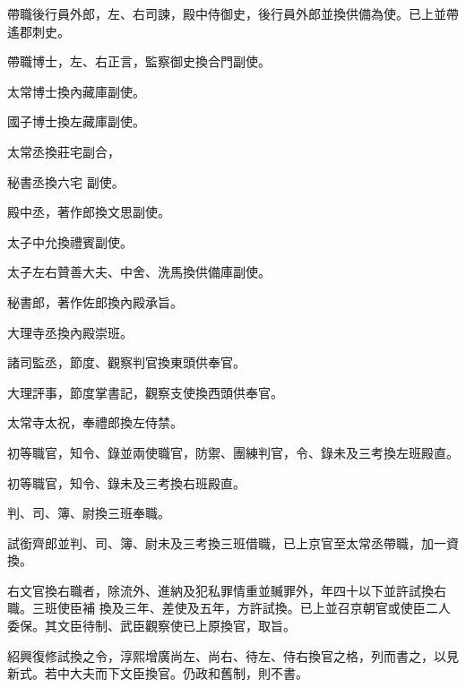 \begin{pinyinscope}
 帶職後行員外郎，左、右司諫，殿中侍御史，後行員外郎並換供備為使。已上並帶遙郡刺史。



 帶職博士，左、右正言，監察御史換合門副使。



 太常博士換內藏庫副使。



 國子博士換左藏庫副使。



 太常丞換莊宅副合，



 秘書丞換六宅
 副使。



 殿中丞，著作郎換文思副使。



 太子中允換禮賓副使。



 太子左右贊善大夫、中舍、洗馬換供備庫副使。



 秘書郎，著作佐郎換內殿承旨。



 大理寺丞換內殿崇班。



 諸司監丞，節度、觀察判官換東頭供奉官。



 大理評事，節度掌書記，觀察支使換西頭供奉官。



 太常寺太祝，奉禮郎換左侍禁。



 初等職官，知令、錄並兩使職官，防禦、團練判官，令、錄未及三考換左班殿直。



 初等職官，知令、錄未及三考換右班殿直。



 判、司、簿、尉換三班奉職。



 試銜齊郎並判、司、簿、尉未及三考換三班借職，已上京官至太常丞帶職，加一資換。



 右文官換右職者，除流外、進納及犯私罪情重並贓罪外，年四十以下並許試換右職。三班使臣補
 換及三年、差使及五年，方許試換。已上並召京朝官或使臣二人委保。其文臣待制、武臣觀察使已上原換官，取旨。



 紹興復修試換之令，淳熙增廣尚左、尚右、待左、侍右換官之格，列而書之，以見新式。若中大夫而下文臣換官。仍政和舊制，則不書。




\end{pinyinscope}
